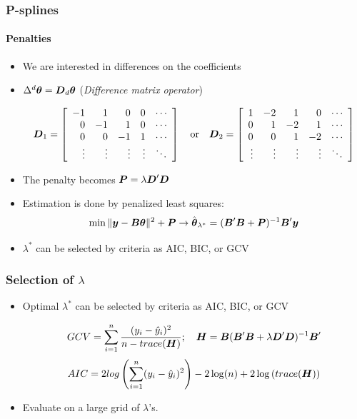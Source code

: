 \documentclass[11pt]{beamer}
\newcommand{\bfy}{\mbox{\boldmath $y$}}
\newcommand{\bfB}{\mbox{\boldmath $B$}}
\newcommand{\bfD}{\mbox{\boldmath $D$}}
\newcommand{\bfH}{\mbox{\boldmath $H$}}
\newcommand{\bfP}{\mbox{\boldmath $P$}}
\newcommand{\bftheta}{\mbox{\boldmath $\theta$}}
\begin{document}
\begin{frame}
\frametitle{P-splines}
\framesubtitle{Penalties}

\footnotesize

\medskip

\begin{itemize}
  \item We are interested in differences on the coefficients 

  \item $\Delta^d\bftheta = \bfD_d\bftheta$ (\textit{Difference matrix operator}) 

\[
 \bfD_1 =\left[
\begin{array}{rrrrr}
- 1 &  1 &  0 & 0 & \cdots \cr
  0 & -1 &  1 & 0 & \cdots \cr
  0 &  0 & -1 & 1 & \cdots \cr
   \vdots & \vdots & \vdots & \vdots & \ddots
\end{array}\right]
\quad \mbox{or} \quad
\bfD_2 =\left[
\begin{array}{rrrrr}
 1 & -2 &  1 &  0 & \cdots\cr
 0 &  1 & -2 &  1 & \cdots\cr
 0 &  0 &  1 & -2 & \cdots\cr
 \vdots & \vdots & \vdots & \vdots & \ddots
\end{array}\right]
\]

 \item The \alert{penalty} becomes {$\bfP=\lambda\bfD^\prime\bfD$} \medskip
 
 \item Estimation is done by \alert{penalized least squares}:
 \[
 \min \|\bfy - \bfB\bftheta\|^2 + \bfP \rightarrow \hat{\bftheta}_{\lambda^*} = (\bfB^\prime\bfB + \bfP)^{-1}\bfB^\prime\bfy
 \]
 \item $\lambda^*$ can be selected by criteria as \alert{AIC}, \alert{BIC}, or \alert{GCV}

\end{itemize}

\vfill\vfill

\end{frame}





\begin{frame}[fragile]
\frametitle{Selection of $\lambda$}
 
 \footnotesize

\begin{itemize}
   \item Optimal $\lambda^*$ can be selected by criteria as \alert{AIC}, \alert{BIC}, or \alert{GCV}

\[
GCV=\sum_{i=1}^{n}\frac{(y_i-\hat y_i)^2}{n-trace(\bfH)}; \quad
\bfH=\bfB(\bfB^{\prime}\bfB+\lambda
\bfD^{\prime}\bfD)^{-1}\bfB^{\prime}\]
\[AIC=2log \left (\sum_{i=1}^{n} (y_i-\hat y_i)^2\right
)-2\log(n)+2\log\left ( trace(\bfH)\right ) 
\]
   \item Evaluate on a large grid of $\lambda$'s.
  

 \end{itemize}

\vfill
\vfill

\end{frame}
\end{document}
